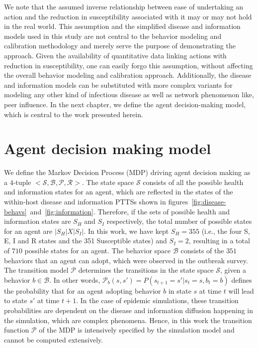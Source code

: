 \documentclass[doublespace]{VTthesis}
\begin{document}
    We note that the assumed inverse relationship between ease of undertaking an action and the reduction in susceptibility associated with it may or may not hold in the real world. This assumption and the simplified disease and information models used in this study are not central to the behavior modeling and calibration methodology and merely serve the purpose of demonstrating the approach. Given the availability of quantitative data linking actions with reduction in susceptibility, one can easily forgo this assumption, without affecting the overall behavior modeling and calibration approach. Additionally, the disease and information models can be substituted with more complex variants for modeling any other kind of infectious disease as well as network phenomenon like, peer influence. In the next chapter, we define the agent decision-making model, which is central to the work presented herein.

    \chapter{Agent decision making model}\label{ch:decision-model}
    We define the Markov Decision Process (MDP) driving agent decision making as a $4$-tuple $\big<\mathcal{S,B,P,R}\big>$. The state space $\mathcal{S}$ consists of all the possible health and information states for an agent, which are reflected in the states of the within-host disease and information PTTSs shown in figures~\ref{fig:disease-behavs}~and~\ref{fig:information}. Therefore, if the sets of possible health and information states are $S_H$ and $S_I$ respectively, the total number of possible states for an agent are $|S_H| X |S_I|$. In this work, we have kept $S_H = 355$ (i.e., the four S, E, I and R states and the 351 Susceptible states) and $S_I = 2$, resulting in a total of $710$ possible states for an agent. The behavior space $\mathcal{B}$ consists of the $351$ behaviors that an agent can adopt, which were observed in the outbreak survey. The transition model $\mathcal{P}$ determines the transitions in the state space $\mathcal{S}$, given a behavior $b \in \mathcal{B}$. In other words, $\mathcal{P}_b(s,s') = P(s_{t+1} = s' | s_t = s, b_t = b)$ defines the probability that for an agent adopting behavior $b$ in state $s$ at time $t$ will lead to state $s'$ at time $t+1$. In the case of epidemic simulations, these transition probabilities are dependent on the disease and information diffusion happening in the simulation, which are complex phenomena. Hence, in this work the transition function $\mathcal{P}$ of the MDP is intensively specified by the simulation model and cannot be computed extensively. 
    
\end{document}
